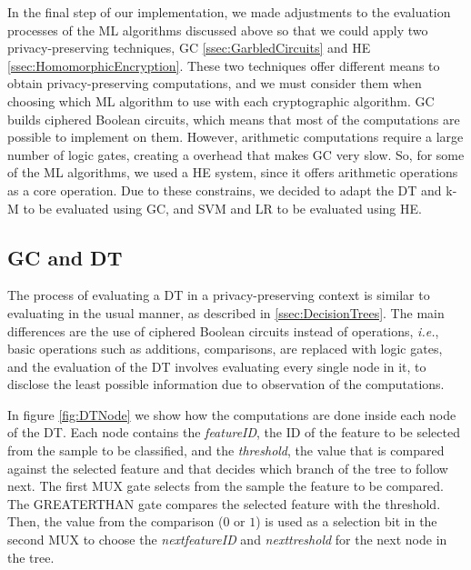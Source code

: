 In the final step of our implementation, we made adjustments to the evaluation processes of the \ac{ML} algorithms discussed above so that we could apply two privacy-preserving techniques, \ac{GC} \ref{ssec:GarbledCircuits} and \ac{HE} \ref{ssec:HomomorphicEncryption}.
These two techniques offer different means to obtain privacy-preserving computations, and we must consider them when choosing which \ac{ML} algorithm to use with each cryptographic algorithm. \ac{GC} builds ciphered Boolean circuits, which means that most of the computations are possible to implement on them. However, arithmetic computations require a large number of logic gates, creating a overhead that makes \ac{GC} very slow. So, for some of the \ac{ML} algorithms, we used a \ac{HE} system, since it offers arithmetic operations as a core operation. Due to these constrains, we decided to adapt the \ac{DT} and \ac{k-M} to be evaluated using \ac{GC}, and \ac{SVM} and \ac{LR} to be evaluated using \ac{HE}.


\subsection{\ac{GC} and \ac{DT}}
\label{ssec:GCandDT}

The process of evaluating a \ac{DT} in a privacy-preserving context is similar to evaluating in the usual manner, as described in \ref{ssec:DecisionTrees}. The main differences are the use of ciphered Boolean circuits instead of operations, \textit{i.e.}, basic operations such as additions, comparisons, are replaced with logic gates, and the evaluation of the \ac{DT} involves evaluating every single node in it, to disclose the least possible information due to observation of the computations.

In figure \ref{fig:DTNode} we show how the computations are done inside each node of the \ac{DT}. Each node contains the \textit{featureID}, the ID of the feature to be selected from the sample to be classified, and the \textit{threshold}, the value that is compared against the selected feature and that decides which branch of the tree to follow next. The first MUX gate selects from the sample the feature to be compared. The GREATERTHAN gate compares the selected feature with the threshold. Then, the value from the comparison ($0$ or $1$) is used as a selection bit in the second MUX to choose the \textit{next\textunderscore featureID} and \textit{next\textunderscore treshold} for the next node in the tree. 


